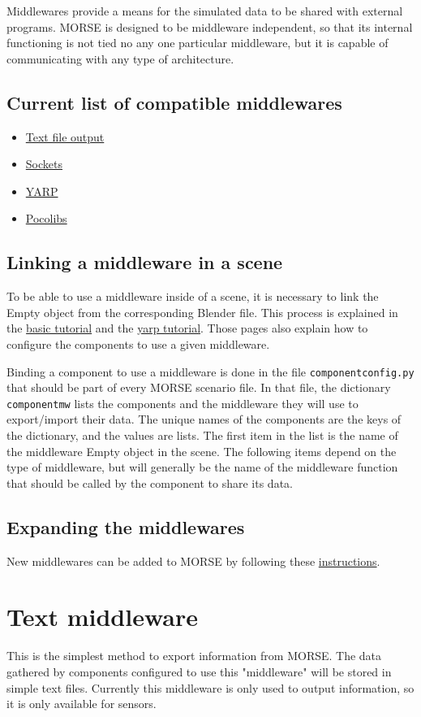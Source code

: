 \documentclass[twoside,a4paper,10pt]{report}
\newcommand{\dokutitlelevelone}[1]{\chapter{#1}}
\newcommand{\dokutitleleveltwo}[1]{\section{#1}}
\newcommand{\dokumonospace}[1]{\texttt{#1}}
\newcommand{\dokuitem}{\item}
\begin{document}
Middlewares provide a means for the simulated data to be shared with external programs. MORSE is designed to be middleware independent, so that its internal functioning is not tied no any one particular middleware, but it is capable of communicating with any type of architecture.


\dokutitleleveltwo{Current list of compatible middlewares}
\label{92515de7e8c9f43d6ca122cbbfd1809e}%

\begin{itemize}
\dokuitem  \hyperref[1cb251ec0d568de6a929b520c4aed8d1]{ Text file output}
\dokuitem  \hyperref[61f2529360aec54f5dc9804b842cf3fa]{ Sockets}
\dokuitem  \hyperref[ec46d0b85077d7a7fe8da2e2b4c70462]{ YARP}
\dokuitem  \hyperref[15f13a3fccdd1ef095539316b61c03c8]{ Pocolibs}
\end{itemize}

\dokutitleleveltwo{Linking a middleware in a scene}
\label{5ded332fc3ba470e4d4d290c9bf26a19}%

To be able to use a middleware inside of a scene, it is necessary to link the Empty object from the corresponding Blender file. This process is explained in the \hyperref[0575c8d592fb7b088226750aceec2b4e]{ basic tutorial} and the \hyperref[1dd029a60f7f3dd1deaf993ce4538edf]{ yarp tutorial}. Those pages also explain how to configure the components to use a given middleware.

Binding a component to use a middleware is done in the file \dokumonospace{component{\textunderscore}config.py} that should be part of every MORSE scenario file. In that file, the dictionary \dokumonospace{component{\textunderscore}mw} lists the components and the middleware they will use to export/import their data. The unique names of the components are the keys of the dictionary, and the values are lists. The first item in the list is the name of the middleware Empty object in the scene. The following items depend on the type of middleware, but will generally be the name of the middleware function that should be called by the component to share its data.


\dokutitleleveltwo{Expanding the middlewares}
\label{b3a6313d335453f4c7ad970485acc1a1}%

New middlewares can be added to MORSE by following these \hyperref[6a8f80abb2f3d2288ad863e67f2499a4]{ instructions}.


\dokutitlelevelone{Text middleware}
\label{f95f886458814bea9965b5a85aedb74b}%
\label{1cb251ec0d568de6a929b520c4aed8d1}%
This is the simplest method to export information from MORSE. The data gathered by components configured to use this "middleware" will be stored in simple text files. Currently this middleware is only used to output information, so it is only available for sensors.
\end{document}
